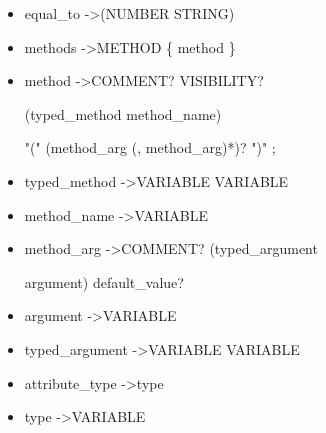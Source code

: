 \begin{itemize}
 \item equal{\_}to   -\textgreater   (NUMBER \textbar STRING)

 \item methods   -\textgreater   METHOD  \{  method  \}

 \item method   -\textgreater   COMMENT?  VISIBILITY?  
 
 (typed{\_}method \textbar method{\_}name)  
 
 "("  (method{\_}arg  (,  method{\_}arg)*)?  ")"  ;

 \item typed{\_}method   -\textgreater   VARIABLE  VARIABLE

 \item method{\_}name   -\textgreater   VARIABLE

 \item method{\_}arg   -\textgreater   COMMENT?  (typed{\_}argument 
 
 \textbar argument)  default{\_}value?

 \item argument   -\textgreater   VARIABLE

 \item typed{\_}argument   -\textgreater   VARIABLE  VARIABLE

 \item attribute{\_}type   -\textgreater   type

 \item type   -\textgreater   VARIABLE

 \end{itemize}